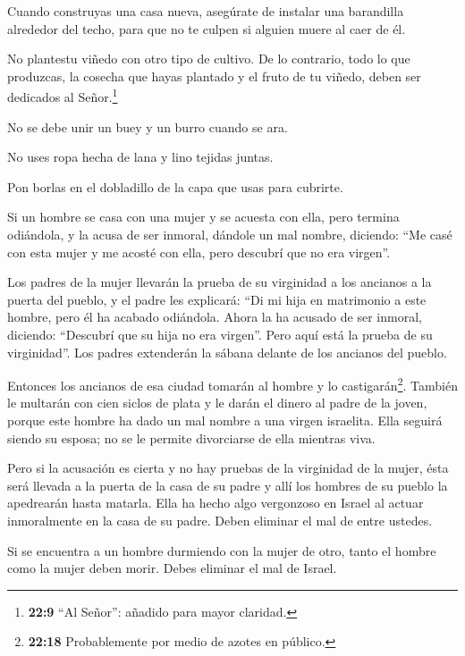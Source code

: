  Cuando construyas una casa nueva, asegúrate de instalar una
barandilla alrededor del techo, para que no te culpen si alguien muere
al caer de él.

 No plantestu viñedo con otro tipo de cultivo. De lo
contrario, todo lo que produzcas, la cosecha que hayas plantado y el
fruto de tu viñedo, deben ser dedicados al Señor.\footnote{\textbf{22:9}
  ``Al Señor'': añadido para mayor claridad.}

 No se debe unir un buey y un burro cuando se ara.

 No uses ropa hecha de lana y lino tejidas juntas.

 Pon borlas en el dobladillo de la capa que usas para
cubrirte.

 Si un hombre se casa con una mujer y se acuesta con ella,
pero termina odiándola,  y la acusa de ser inmoral, dándole
un mal nombre, diciendo: ``Me casé con esta mujer y me acosté con ella,
pero descubrí que no era virgen''.

 Los padres de la mujer llevarán la prueba de su virginidad
a los ancianos a la puerta del pueblo,  y el padre les
explicará: ``Di mi hija en matrimonio a este hombre, pero él ha acabado
odiándola.  Ahora la ha acusado de ser inmoral, diciendo:
``Descubrí que su hija no era virgen''. Pero aquí está la prueba de su
virginidad''. Los padres extenderán la sábana delante de los ancianos
del pueblo.

 Entonces los ancianos de esa ciudad tomarán al hombre y lo
castigarán\footnote{\textbf{22:18} Probablemente por medio de azotes en
  público.}.  También le multarán con cien siclos de plata
y le darán el dinero al padre de la joven, porque este hombre ha dado un
mal nombre a una virgen israelita. Ella seguirá siendo su esposa; no se
le permite divorciarse de ella mientras viva.

 Pero si la acusación es cierta y no hay pruebas de la
virginidad de la mujer,  ésta será llevada a la puerta de
la casa de su padre y allí los hombres de su pueblo la apedrearán hasta
matarla. Ella ha hecho algo vergonzoso en Israel al actuar inmoralmente
en la casa de su padre. Deben eliminar el mal de entre ustedes.

 Si se encuentra a un hombre durmiendo con la mujer de
otro, tanto el hombre como la mujer deben morir. Debes eliminar el mal
de Israel.

